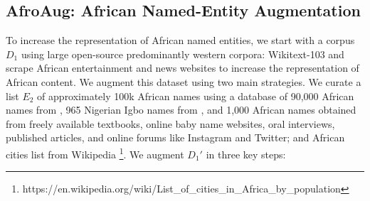 \documentclass{INTERSPEECH2023}
\begin{document}
\subsection{AfroAug: African Named-Entity Augmentation}\label{section:name-aug}

To increase the representation of African named entities, we start with a corpus $D_1$ using large open-source predominantly western corpora: Wikitext-103 \cite{merity2016pointer} and scrape African entertainment and news websites to increase the representation of African content. We augment this dataset using two main strategies. 
We curate a list $E_2$ of approximately 100k African names using a database of 90,000 African names from \cite{anderson2013using}, 965 Nigerian Igbo names from \cite{okagbue2017personal}, and 1,000 African names obtained from freely available textbooks, online baby name websites, oral interviews, published articles, and online forums like Instagram and Twitter; and African cities list from Wikipedia \footnote{https://en.wikipedia.org/wiki/List\_of\_cities\_in\_Africa\_by\_population}. We augment $D_1'$ in three key steps:
\end{document}
